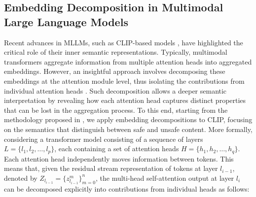 \documentclass[acmsmall]{acmart}
\begin{document}
\subsection{Embedding Decomposition in Multimodal Large Language Models}\label{subsec:embedd_deco}
Recent advances in MLLMs, such as CLIP-based models \cite{radford2021learning}, have highlighted the critical role of their inner semantic representations. Typically, multimodal transformers aggregate information from multiple attention heads into aggregated embeddings. However, an insightful approach involves decomposing these embeddings at the attention module level, thus isolating the contributions from individual attention heads \cite{elhage2021mathematical, gandelsman2023interpreting, bhalla2024interpreting}. Such decomposition allows a deeper semantic interpretation by revealing how each attention head captures distinct properties that can be lost in the aggregation process.
To this end, starting from the methodology proposed in \cite{gandelsman2023interpreting}, we apply embedding decompositions to CLIP, focusing on the semantics that distinguish between safe and unsafe content. More formally, considering a transformer model consisting of a sequence of layers $L = \{l_1, l_2, \dots, l_p\}$, each containing a set of attention heads $H = \{h_1, h_2, \dots, h_q\}$. Each attention head independently moves information between tokens. This means that, given the residual stream representation of tokens at layer $l_{i-1}$, denoted by $Z_{l_{i-1}} = \{z^m_{l_{i-1}}\}_{m=0}^{n}$, the multi-head self-attention output at layer $l_i$ can be decomposed explicitly into contributions from individual heads as follows:
\end{document}
